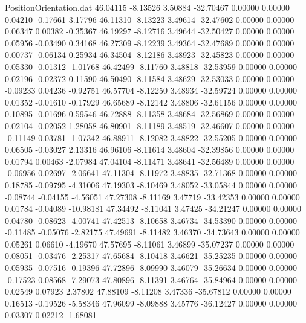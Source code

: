 \begin{filecontents}{PositionOrientation.dat}
  46.04115   -8.13526    3.50884   -32.70467    0.00000    0.00000    0.04210   -0.17661    3.17796
  46.11310   -8.13223    3.49614   -32.47602    0.00000    0.00000    0.06347    0.00382   -0.35367
  46.19297   -8.12716    3.49644   -32.50427    0.00000    0.00000    0.05956   -0.03490    0.34168
  46.27309   -8.12239    3.49364   -32.47689    0.00000    0.00000    0.00737   -0.06134    0.25934
  46.34504   -8.12186    3.48923   -32.45823    0.00000    0.00000    0.05330   -0.01312   -1.01768
  46.42499   -8.11760    3.48818   -32.53959    0.00000    0.00000    0.02196   -0.02372    0.11590
  46.50490   -8.11584    3.48629   -32.53033    0.00000    0.00000   -0.09233    0.04236   -0.92751
  46.57704   -8.12250    3.48934   -32.59724    0.00000    0.00000    0.01352   -0.01610   -0.17929
  46.65689   -8.12142    3.48806   -32.61156    0.00000    0.00000    0.10895   -0.01696    0.59546
  46.72888   -8.11358    3.48684   -32.56869    0.00000    0.00000    0.02104   -0.02052    1.28058
  46.80901   -8.11189    3.48519   -32.46607    0.00000    0.00000   -0.11149    0.03781   -1.07342
  46.88911   -8.12082    3.48822   -32.55205    0.00000    0.00000    0.06505   -0.03027    2.13316
  46.96106   -8.11614    3.48604   -32.39856    0.00000    0.00000    0.01794    0.00463   -2.07984
  47.04104   -8.11471    3.48641   -32.56489    0.00000    0.00000   -0.06956    0.02697   -2.06641
  47.11304   -8.11972    3.48835   -32.71368    0.00000    0.00000    0.18785   -0.09795   -4.31006
  47.19303   -8.10469    3.48052   -33.05844    0.00000    0.00000   -0.08744   -0.04155   -4.56051
  47.27308   -8.11169    3.47719   -33.42353    0.00000    0.00000    0.01784   -0.04089  -10.98181
  47.34492   -8.11041    3.47425   -34.21247    0.00000    0.00000    0.04780   -0.08623   -4.00741
  47.42513   -8.10658    3.46734   -34.53390    0.00000    0.00000   -0.11485   -0.05076   -2.82175
  47.49691   -8.11482    3.46370   -34.73643    0.00000    0.00000    0.05261    0.06610   -4.19670
  47.57695   -8.11061    3.46899   -35.07237    0.00000    0.00000    0.08051   -0.03476   -2.25317
  47.65684   -8.10418    3.46621   -35.25235    0.00000    0.00000    0.05935   -0.07516   -0.19396
  47.72896   -8.09990    3.46079   -35.26634    0.00000    0.00000   -0.17523    0.08568   -7.29073
  47.80896   -8.11391    3.46764   -35.84964    0.00000    0.00000    0.02549    0.07923    2.37802
  47.88109   -8.11208    3.47336   -35.67812    0.00000    0.00000    0.16513   -0.19526   -5.58346
  47.96099   -8.09888    3.45776   -36.12427    0.00000    0.00000    0.03307    0.02212   -1.68081

\end{filecontents}
